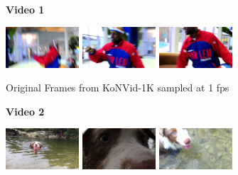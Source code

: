 \documentclass[10pt,twocolumn,letterpaper]{article}
\begin{document}
\begin{figure}
   \centering
   \begin{subfigure}[b]{0.45\textwidth}
     \centering
     \textbf{Video 1}\par\medskip
     \includegraphics[width=0.3\textwidth,keepaspectratio]{qa_maps/vid1/org_1.png} \hfill
     \includegraphics[width=0.3\textwidth,keepaspectratio]{qa_maps/vid1/org_2.png} \hfill
     \includegraphics[width=0.3\textwidth,keepaspectratio]{qa_maps/vid1/org_3.png} \hfill
     \caption{Original Frames from KoNVid-1K sampled at 1 fps}
     \label{konvid_org}
   \end{subfigure}
   \hfill
   \begin{subfigure}[b]{0.45\textwidth}
     \centering
     \textbf{Video 2}\par\medskip
     \includegraphics[width=0.3\textwidth,keepaspectratio]{qa_maps/vid2/org_1.png} \hfill
     \includegraphics[width=0.3\textwidth,keepaspectratio]{qa_maps/vid2/org_2.png}\hfill
     \includegraphics[width=0.3\textwidth,keepaspectratio]{qa_maps/vid2/org_3.png}\hfill

\end{subfigure}
\end{figure}
\end{document}

